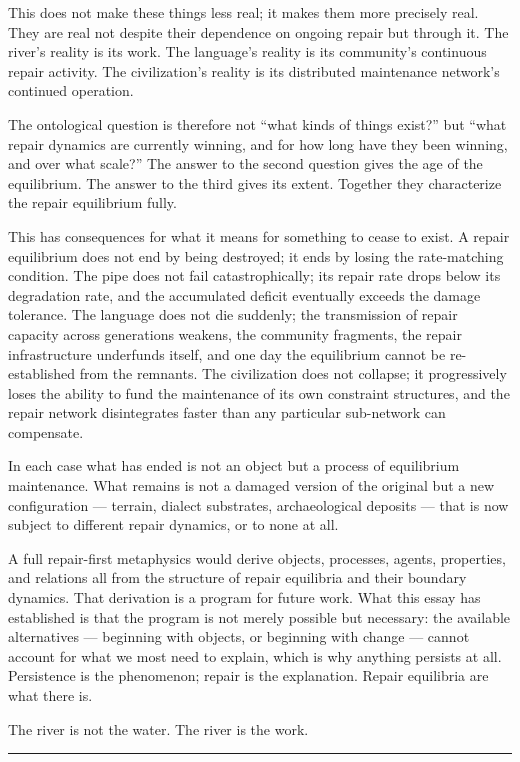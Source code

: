 \documentclass[11pt, a4paper]{article}
\theoremstyle{definition}
\theoremstyle{remark}
\begin{document}
This does not make these things less real; it makes them more precisely real.
They are real not despite their dependence on ongoing repair but through it.
The river's reality is its work. The language's reality is its community's
continuous repair activity. The civilization's reality is its distributed
maintenance network's continued operation.

The ontological question is therefore not ``what kinds of things exist?'' but
``what repair dynamics are currently winning, and for how long have they been
winning, and over what scale?'' The answer to the second question gives the
age of the equilibrium. The answer to the third gives its extent. Together
they characterize the repair equilibrium fully.

This has consequences for what it means for something to cease to exist. A
repair equilibrium does not end by being destroyed; it ends by losing the
rate-matching condition. The pipe does not fail catastrophically; its repair
rate drops below its degradation rate, and the accumulated deficit eventually
exceeds the damage tolerance. The language does not die suddenly; the
transmission of repair capacity across generations weakens, the community
fragments, the repair infrastructure underfunds itself, and one day the
equilibrium cannot be re-established from the remnants. The civilization does
not collapse; it progressively loses the ability to fund the maintenance of
its own constraint structures, and the repair network disintegrates faster
than any particular sub-network can compensate.

In each case what has ended is not an object but a process of equilibrium
maintenance. What remains is not a damaged version of the original but a new
configuration --- terrain, dialect substrates, archaeological deposits ---
that is now subject to different repair dynamics, or to none at all.

A full repair-first metaphysics would derive objects, processes, agents,
properties, and relations all from the structure of repair equilibria and
their boundary dynamics. That derivation is a program for future work.
What this essay has established is that the program is not merely possible
but necessary: the available alternatives --- beginning with objects, or
beginning with change --- cannot account for what we most need to explain,
which is why anything persists at all. Persistence is the phenomenon; repair
is the explanation. Repair equilibria are what there is.

The river is not the water. The river is the work.

\bigskip

\noindent\rule{0.4\textwidth}{0.4pt}

\vspace{0.5em}
\end{document}
